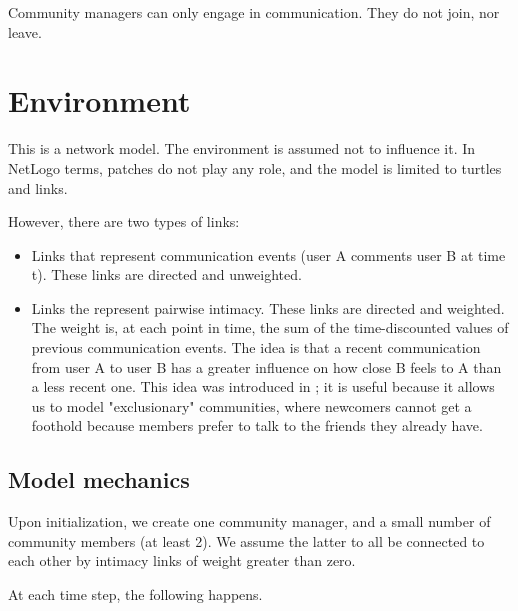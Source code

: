 \documentclass{article}
\begin{document}
Community managers can only engage in communication. They do not join, nor leave. 

\section{Environment}

This is a network model. The environment is assumed not to influence it. In NetLogo terms, patches do not play any role, and the model is limited to turtles and links.

However, there are two types of links:
\begin{itemize}
\item Links that represent communication events (user A comments user B at time t). These links are directed and unweighted.
\item Links the represent pairwise intimacy. These links are directed and weighted. The weight is, at each point in time, the sum of the time-discounted values of previous communication events. The idea is that a recent communication from user A to user B has a greater influence on how close B feels to A than a less recent one. This idea was introduced in \cite{kim2015group}; it is useful because it allows us to model "exclusionary" communities, where newcomers cannot get a foothold because members prefer to talk to the friends they already have. 
\end{itemize}

\subsection{Model mechanics}

Upon initialization, we create one community manager, and a small number of community members (at least 2). We assume the latter to all be connected to each other by intimacy links of weight greater than zero. 

At each time step, the following happens.
\end{document}

